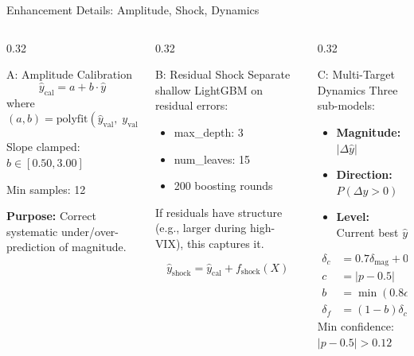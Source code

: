 \documentclass[aspectratio=169,10pt]{beamer}
\begin{document}
\begin{frame}{Enhancement Details: Amplitude, Shock, Dynamics}
\begin{columns}[T]
\begin{column}{0.32\textwidth}
\begin{block}{A: Amplitude Calibration}
\footnotesize
\[
\hat{y}_{\text{cal}} = a + b \cdot \hat{y}
\]
where $(a, b) = \text{polyfit}(\hat{y}_{\text{val}},\; y_{\text{val}},\; 1)$

\vspace{0.1cm}
Slope clamped: $b \in [0.50, 3.00]$

\vspace{0.1cm}
Min samples: 12

\vspace{0.1cm}
\textbf{Purpose:} Correct systematic under/over-prediction of magnitude.
\end{block}
\end{column}
\begin{column}{0.32\textwidth}
\begin{block}{B: Residual Shock}
\footnotesize
Separate shallow LightGBM on residual errors:
\begin{itemize}\scriptsize
  \item max\_depth: 3
  \item num\_leaves: 15
  \item 200 boosting rounds
\end{itemize}

\vspace{0.1cm}
If residuals have structure (e.g., larger during high-VIX), this captures it.

\[
\hat{y}_{\text{shock}} = \hat{y}_{\text{cal}} + f_{\text{shock}}(X)
\]
\end{block}
\end{column}
\begin{column}{0.32\textwidth}
\begin{block}{C: Multi-Target Dynamics}
\footnotesize
Three sub-models:
\begin{itemize}\scriptsize
  \item \textbf{Magnitude:} $|\Delta \hat{y}|$
  \item \textbf{Direction:} $P(\Delta y > 0)$
  \item \textbf{Level:} Current best $\hat{y}$
\end{itemize}
\begin{align*}
\delta_c &= 0.7 \delta_{\text{mag}} + 0.3 \delta_{\text{cur}} \\
c &= |p - 0.5| \\
b &= \min(0.8 c,\; 1) \\
\delta_f &= (1{-}b)\delta_c + b\delta_{\text{dir}}
\end{align*}
Min confidence: $|p - 0.5| > 0.12$
\end{block}
\end{column}
\end{columns}
\end{frame}
\end{document}
